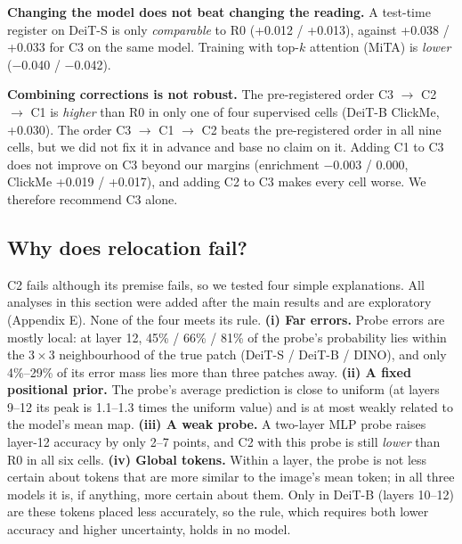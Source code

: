 \documentclass{article}
\begin{document}
\textbf{Changing the model does not beat changing the reading.} A test-time register on DeiT-S is only \emph{comparable} to R0 (+0.012 / +0.013), against +0.038 / +0.033 for C3 on the same model. Training with top-$k$ attention (MiTA) is \emph{lower} ($-$0.040 / $-$0.042).

\textbf{Combining corrections is not robust.} The pre-registered order C3 $\to$ C2 $\to$ C1 is \emph{higher} than R0 in only one of four supervised cells (DeiT-B ClickMe, +0.030). The order C3 $\to$ C1 $\to$ C2 beats the pre-registered order in all nine cells, but we did not fix it in advance and base no claim on it. Adding C1 to C3 does not improve on C3 beyond our margins (enrichment $-$0.003 / 0.000, ClickMe +0.019 / +0.017), and adding C2 to C3 makes every cell worse. We therefore recommend C3 alone.

\subsection{Why does relocation fail?}

C2 fails although its premise fails, so we tested four simple explanations. All analyses in this section were added after the main results and are exploratory (Appendix E). None of the four meets its rule. \textbf{(i) Far errors.} Probe errors are mostly local: at layer 12, 45\% / 66\% / 81\% of the probe's probability lies within the $3\times3$ neighbourhood of the true patch (DeiT-S / DeiT-B / DINO), and only 4\%--29\% of its error mass lies more than three patches away. \textbf{(ii) A fixed positional prior.} The probe's average prediction is close to uniform (at layers 9--12 its peak is 1.1--1.3 times the uniform value) and is at most weakly related to the model's mean map. \textbf{(iii) A weak probe.} A two-layer MLP probe raises layer-12 accuracy by only 2--7 points, and C2 with this probe is still \emph{lower} than R0 in all six cells. \textbf{(iv) Global tokens.} Within a layer, the probe is not less certain about tokens that are more similar to the image's mean token; in all three models it is, if anything, more certain about them. Only in DeiT-B (layers 10--12) are these tokens placed less accurately, so the rule, which requires both lower accuracy and higher uncertainty, holds in no model.
\end{document}
